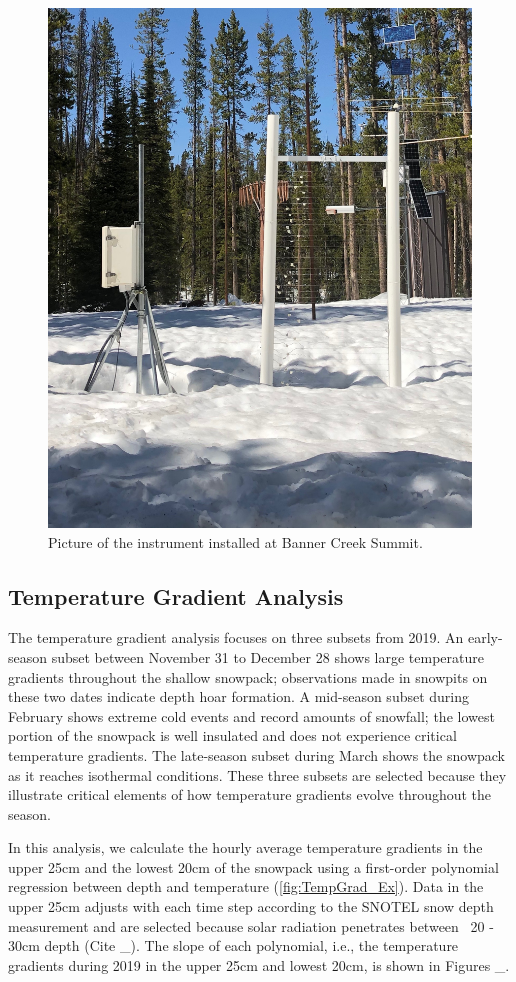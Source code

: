  \begin{figure}[H]
    \centering
    \includegraphics[width=0.7\linewidth]{figures/Banner_Sensor.jpeg}
    \caption{Picture of the instrument installed at Banner Creek Summit.}
    \label{fig:Banner_Sensor}
 \end{figure}
 
\subsection{Temperature Gradient Analysis}
The temperature gradient analysis focuses on three subsets from 2019. An early-season subset between November 31 to December 28 shows large temperature gradients throughout the shallow snowpack; observations made in snowpits on these two dates indicate depth hoar formation. A mid-season subset during February shows extreme cold events and record amounts of snowfall; the lowest portion of the snowpack is well insulated and does not experience critical temperature gradients. The late-season subset during March shows the snowpack as it reaches isothermal conditions. These three subsets are selected because they illustrate critical elements of how temperature gradients evolve throughout the season. 

In this analysis, we calculate the hourly average temperature gradients in the upper 25cm and the lowest 20cm of the snowpack using a first-order polynomial regression between depth and temperature (\ref{fig:TempGrad_Ex}).  Data in the upper 25cm adjusts with each time step according to the SNOTEL snow depth measurement and are selected because solar radiation penetrates between ~20 - 30cm depth (Cite \_). The slope of each polynomial, i.e., the temperature gradients during 2019 in the upper 25cm and lowest 20cm, is shown in Figures \_.  

